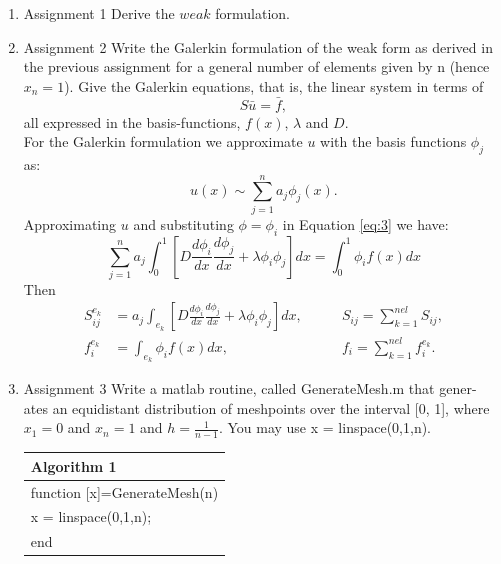 \documentclass[a4paper,10pt]{report}
\begin{document}
\begin{enumerate}
 \item{Assignment 1} Derive the $weak$ formulation. \\
 
\item{Assignment 2} Write the Galerkin formulation of the weak form as derived
in the previous assignment for a general number of elements given by n (hence
$x_n = 1$). Give the Galerkin equations, that is, the linear system in terms of
\begin{equation}\label{eq:4}
S\bar{u} = \bar{f},
 \end{equation}
all expressed in the basis-functions, $f(x)$, $\lambda$ and $D$.\\
For the Galerkin formulation we approximate ${u}$ with the basis functions $\phi_j$ as:
$$u(x)\sim \sum_{j=1}^na_j\phi_j(x).$$
Approximating $u$ and substituting $\phi=\phi_i$ in Equation \eqref{eq:3} we have:
 \begin{equation}\label{eq:5}
\sum_{j=1}^na_j\int_{0}^{1}\left[D\frac{d\phi_i}{dx}\frac{d\phi_j}{dx}+\lambda \phi_i \phi_j \right]dx= \int_{0}^{1}\phi_i f(x)dx
\end{equation}
Then 
\begin{align*}
S_{ij}^{e_k}&=a_j\int_{e_k}\left[D\frac{d\phi_i}{dx}\frac{d\phi_j}{dx}+\lambda \phi_i \phi_j \right]dx, \qquad &S_{ij}=\sum_{k=1}^{nel}S_{ij},\\
f_i^{e_k}&=\int_{e_k}\phi_i f(x)dx, \qquad &f_i=\sum_{k=1}^{nel}f_i^{e_k}.
\end{align*}
\item{Assignment 3} Write a matlab routine, called GenerateMesh.m that gener-
ates an equidistant distribution of meshpoints over the interval [0, 1], where
$x_1 = 0$ and $x_n = 1$ and $h =\frac{1}{n−1}$. You may use x = linspace(0,1,n).

\begin{table}[!h]\centering

\begin{tabular}{ |l| } 
\hline
\textbf{Algorithm 1}\\
\hline
\hspace{0.5cm}function [x]=GenerateMesh(n)\\
\hspace{1cm}x = linspace(0,1,n);\\
\hspace{0.5cm}end\\
\hline
\end{tabular}
\end{table}


\end{enumerate}
\end{document}
